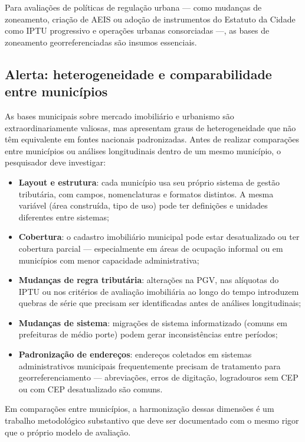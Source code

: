 Para avaliações de políticas de regulação urbana --- como mudanças de zoneamento, criação de AEIS ou adoção de instrumentos do Estatuto da Cidade como IPTU progressivo e operações urbanas consorciadas ---, as bases de zoneamento georreferenciadas são insumos essenciais.

\subsection{Alerta: heterogeneidade e comparabilidade entre municípios}

As bases municipais sobre mercado imobiliário e urbanismo são extraordinariamente valiosas, mas apresentam graus de heterogeneidade que não têm equivalente em fontes nacionais padronizadas. Antes de realizar comparações entre municípios ou análises longitudinais dentro de um mesmo município, o pesquisador deve investigar:

\begin{itemize}
  \item \textbf{Layout e estrutura}: cada município usa seu próprio sistema de gestão tributária, com campos, nomenclaturas e formatos distintos. A mesma variável (área construída, tipo de uso) pode ter definições e unidades diferentes entre sistemas;
  \item \textbf{Cobertura}: o cadastro imobiliário municipal pode estar desatualizado ou ter cobertura parcial --- especialmente em áreas de ocupação informal ou em municípios com menor capacidade administrativa;
  \item \textbf{Mudanças de regra tributária}: alterações na PGV, nas alíquotas do IPTU ou nos critérios de avaliação imobiliária ao longo do tempo introduzem quebras de série que precisam ser identificadas antes de análises longitudinais;
  \item \textbf{Mudanças de sistema}: migrações de sistema informatizado (comuns em prefeituras de médio porte) podem gerar inconsistências entre períodos;
  \item \textbf{Padronização de endereços}: endereços coletados em sistemas administrativos municipais frequentemente precisam de tratamento para georreferenciamento --- abreviações, erros de digitação, logradouros sem CEP ou com CEP desatualizado são comuns.
\end{itemize}

Em comparações entre municípios, a harmonização dessas dimensões é um trabalho metodológico substantivo que deve ser documentado com o mesmo rigor que o próprio modelo de avaliação.

